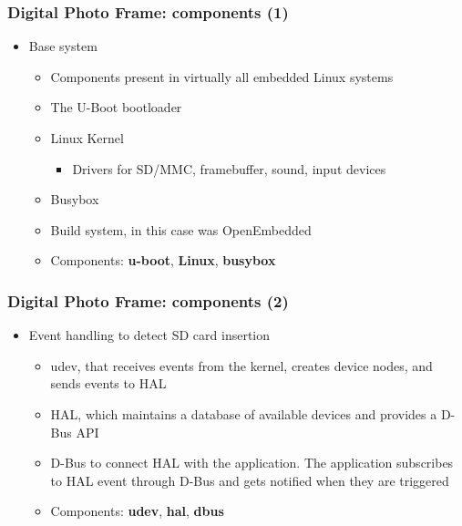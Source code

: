 \begin{frame}
  \frametitle{Digital Photo Frame: components (1)}
  \begin{itemize}
  \item Base system
    \begin{itemize}
    \item Components present in virtually all embedded Linux systems
    \item The U-Boot bootloader
    \item Linux Kernel
      \begin{itemize}
      \item Drivers for SD/MMC, framebuffer, sound, input devices
      \end{itemize}
    \item Busybox
    \item Build system, in this case was OpenEmbedded
    \item Components: {\bf u-boot}, {\bf Linux}, {\bf busybox}
    \end{itemize}
  \end{itemize}
\end{frame}

\begin{frame}
  \frametitle{Digital Photo Frame: components (2)}
  \begin{itemize}
  \item Event handling to detect SD card insertion
    \begin{itemize}
    \item udev, that receives events from the kernel, creates device
      nodes, and sends events to HAL
    \item HAL, which maintains a database of available devices and
      provides a D-Bus API
    \item D-Bus to connect HAL with the application. The application
      subscribes to HAL event through D-Bus and gets notified when
      they are triggered
    \item Components: {\bf udev}, {\bf hal}, {\bf dbus}
    \end{itemize}
  \end{itemize}
\end{frame}

